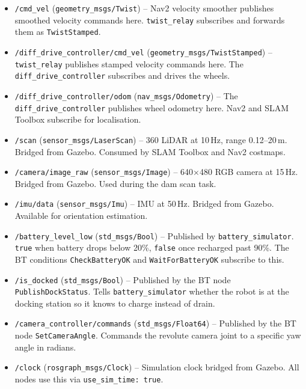 \documentclass[12pt, a4paper]{article}
\begin{document}
\begin{itemize}
    \item \texttt{/cmd\_vel} (\texttt{geometry\_msgs/Twist}) -- Nav2 velocity smoother publishes smoothed velocity commands here. \texttt{twist\_relay} subscribes and forwards them as \texttt{TwistStamped}.

    \item \texttt{/diff\_drive\_controller/cmd\_vel} (\texttt{geometry\_msgs/TwistStamped}) -- \texttt{twist\_relay} publishes stamped velocity commands here. The \texttt{diff\_drive\_controller} subscribes and drives the wheels.

    \item \texttt{/diff\_drive\_controller/odom} (\texttt{nav\_msgs/Odometry}) -- The \texttt{diff\_drive\_controller} publishes wheel odometry here. Nav2 and SLAM Toolbox subscribe for localisation.

    \item \texttt{/scan} (\texttt{sensor\_msgs/LaserScan}) -- 360\textdegree{} LiDAR at 10\,Hz, range 0.12--20\,m. Bridged from Gazebo. Consumed by SLAM Toolbox and Nav2 costmaps.

    \item \texttt{/camera/image\_raw} (\texttt{sensor\_msgs/Image}) -- 640$\times$480 RGB camera at 15\,Hz. Bridged from Gazebo. Used during the dam scan task.

    \item \texttt{/imu/data} (\texttt{sensor\_msgs/Imu}) -- IMU at 50\,Hz. Bridged from Gazebo. Available for orientation estimation.

    \item \texttt{/battery\_level\_low} (\texttt{std\_msgs/Bool}) -- Published by \texttt{battery\_simulator}. \texttt{true} when battery drops below 20\%, \texttt{false} once recharged past 90\%. The BT conditions \texttt{CheckBatteryOK} and \texttt{WaitForBatteryOK} subscribe to this.

    \item \texttt{/is\_docked} (\texttt{std\_msgs/Bool}) -- Published by the BT node \texttt{PublishDockStatus}. Tells \texttt{battery\_simulator} whether the robot is at the docking station so it knows to charge instead of drain.

    \item \texttt{/camera\_controller/commands} (\texttt{std\_msgs/Float64}) -- Published by the BT node \texttt{SetCameraAngle}. Commands the revolute camera joint to a specific yaw angle in radians.

    \item \texttt{/clock} (\texttt{rosgraph\_msgs/Clock}) -- Simulation clock bridged from Gazebo. All nodes use this via \texttt{use\_sim\_time: true}.
\end{itemize}
\end{document}
